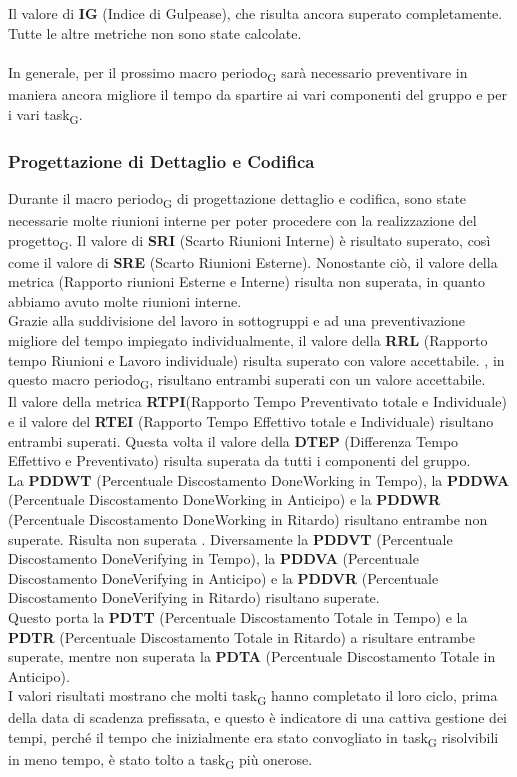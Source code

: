 Il valore di \textbf{IG} (Indice di Gulpease), che risulta ancora superato completamente.\\
Tutte le altre metriche non sono state calcolate.\\\\
In generale, per il prossimo macro periodo\textsubscript{G} sarà necessario preventivare in maniera ancora migliore il tempo da spartire ai vari componenti del gruppo e per i vari task\textsubscript{G}.

\subsubsection{Progettazione di Dettaglio e Codifica}
Durante il macro periodo\textsubscript{G} di progettazione dettaglio e codifica, sono state necessarie molte riunioni interne per poter procedere con la realizzazione del progetto\textsubscript{G}.
Il valore di \textbf{SRI} (Scarto Riunioni Interne) è risultato superato, così come il valore di \textbf{SRE} (Scarto Riunioni Esterne). Nonostante ciò, il valore della metrica (Rapporto riunioni Esterne e Interne) risulta non superata, in quanto abbiamo avuto molte riunioni interne.\\
Grazie alla suddivisione del lavoro in sottogruppi e ad una preventivazione migliore del tempo impiegato individualmente, il valore della \textbf{RRL} (Rapporto tempo Riunioni e Lavoro individuale) risulta superato con valore accettabile. , in questo macro periodo\textsubscript{G}, risultano entrambi superati con un valore accettabile. \\
Il valore della metrica \textbf{RTPI}(Rapporto Tempo Preventivato totale e Individuale) e il valore del \textbf{RTEI} (Rapporto Tempo Effettivo totale e Individuale) risultano entrambi superati.
Questa volta il valore della \textbf{DTEP} (Differenza Tempo Effettivo e Preventivato) risulta superata da tutti i componenti del gruppo.\\
La \textbf{PDDWT} (Percentuale Discostamento DoneWorking in Tempo), la \textbf{PDDWA} (Percentuale Discostamento DoneWorking in Anticipo) e la \textbf{PDDWR} (Percentuale Discostamento DoneWorking in Ritardo) risultano entrambe non superate. Risulta non superata . Diversamente la \textbf{PDDVT} (Percentuale Discostamento DoneVerifying in Tempo), la \textbf{PDDVA} (Percentuale Discostamento DoneVerifying in Anticipo) e la \textbf{PDDVR} (Percentuale Discostamento DoneVerifying in Ritardo) risultano superate. \\ Questo porta la \textbf{PDTT} (Percentuale Discostamento Totale in Tempo) e la \textbf{PDTR} (Percentuale Discostamento Totale in Ritardo) a risultare entrambe superate, mentre non superata la \textbf{PDTA} (Percentuale Discostamento Totale in Anticipo).\\ I valori risultati mostrano che molti task\textsubscript{G} hanno completato il loro ciclo, prima della data di scadenza prefissata, e questo è indicatore di una cattiva gestione dei tempi, perché il tempo che inizialmente era stato convogliato in task\textsubscript{G} risolvibili in meno tempo, è stato tolto a task\textsubscript{G} più onerose.\\

